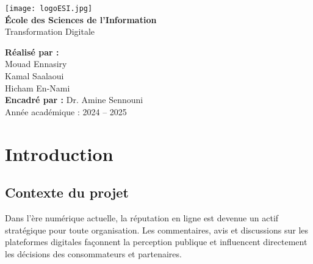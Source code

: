 \documentclass[12pt,a4paper]{report}
\begin{document}
\begin{titlepage}
    \begin{center}
        \texttt{[image: logoESI.jpg]}\\[1cm]

        {\Large \textbf{École des Sciences de l'Information}}\\[0.5cm]
        {\large Transformation Digitale}\\[2cm]


        \vspace{2cm}
        \textbf{Réalisé par :}\\[0.5cm]
        Mouad Ennasiry\\
        Kamal Saalaoui\\
        Hicham En-Nami\\[1cm]

        \textbf{Encadré par :} Dr. Amine Sennouni\\[1cm]

        {\large Année académique : 2024 -- 2025}

        \vfill
    \end{center}
\end{titlepage}


\tableofcontents

\chapter{Introduction}

\section{Contexte du projet}
Dans l'ère numérique actuelle, la réputation en ligne est devenue un actif stratégique pour toute organisation. Les commentaires, avis et discussions sur les plateformes digitales façonnent la perception publique et influencent directement les décisions des consommateurs et partenaires.
\end{document}
